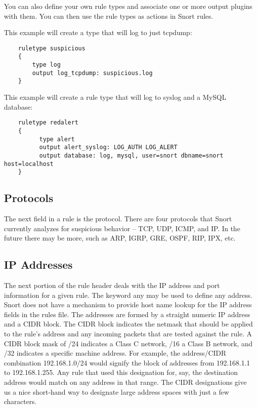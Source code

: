 \documentclass[english]{report}
\begin{document}
You can also define your own rule types and associate one or more output
plugins with them. You can then use the rule types as actions in Snort rules.

This example will create a type that will log to just tcpdump:

\begin{verbatim}
    ruletype suspicious
    {
        type log 
        output log_tcpdump: suspicious.log
    }
\end{verbatim}

This example will create a rule type that will log to syslog and a MySQL
database:

\begin{verbatim}
    ruletype redalert
    {
          type alert 
          output alert_syslog: LOG_AUTH LOG_ALERT 
          output database: log, mysql, user=snort dbname=snort host=localhost 
    }
\end{verbatim}

\subsection{Protocols}

The next field in a rule is the protocol. There are four protocols that Snort
currently analyzes for suspicious behavior -- TCP, UDP, ICMP, and IP. In the
future there may be more, such as ARP, IGRP, GRE, OSPF, RIP, IPX, etc.

\subsection{IP Addresses}

The next portion of the rule header deals with the IP address and port
information for a given rule. The keyword any may be used to define any
address. Snort does not have a mechanism to provide host name lookup for the IP
address fields in the rules file. The addresses are formed by a straight
numeric IP address and a CIDR\cite{cidrnotation} block. The CIDR block
indicates the netmask that should be applied to the rule's address and any
incoming packets that are tested against the rule. A CIDR block mask of /24
indicates a Class C network, /16 a Class B network, and /32 indicates a
specific machine address. For example, the address/CIDR combination
192.168.1.0/24 would signify the block of addresses from 192.168.1.1 to
192.168.1.255.  Any rule that used this designation for, say, the destination
address would match on any address in that range. The CIDR designations give us
a nice short-hand way to designate large address spaces with just a few
characters.
\end{document}
